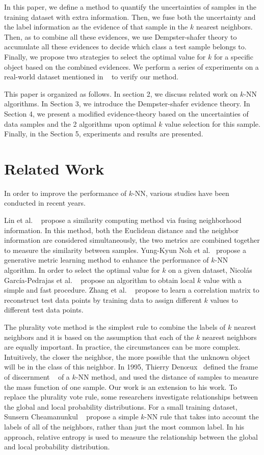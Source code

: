 \documentclass[runningheads]{llncs}
\begin{document}
In this paper, we define a method to quantify the uncertainties of samples in the training dataset with extra information. Then, we fuse both the uncertainty and the label information as the evidence of that sample in the $k$ nearest neighbors. Then, as to combine all these evidences, we use Dempster-shafer theory to accumulate  all these evidences to decide which class a test sample belongs to. Finally, we propose two strategies to select the optimal value for $k$ for a specific object based on the combined evidences. We perform a series of experiments on a real-world dataset mentioned in ~\cite{ref_article9} to verify our method.

This paper is organized as follows. In section 2, we discuss related work on $k$-NN algorithms. In Section 3, we introduce the Dempster-shafer evidence theory. In Section 4, we present a modified evidence-theory based on the uncertainties of data samples and the 2 algorithms upon optimal $k$ value selection for this sample. Finally, in the Section 5, experiments and results are presented.


\section{Related Work}
In order to improve the performance of $k$-NN, various studies have been conducted in recent years.

Lin et al. ~\cite{ref_article5} propose a similarity computing method via fusing neighborhood information. In this method, both the Euclidean distance and the neighbor information are considered simultaneously, the two metrics are combined together to measure the similarity between samples. Yung-Kyun Noh et al.~\cite{ref_article6} propose a generative metric learning method to enhance the performance of $k$-NN algorithm. In order to select the optimal value for $k$ on a given dataset,  Nicolás García-Pedrajas et al. ~\cite{ref_article7} propose an algorithm to obtain local $k$ value with a simple and fast procedure. Zhang et al. ~\cite{ref_article8} propose to learn a correlation matrix to reconstruct test data points by training data to assign different $k$ values to different test data points. 

The plurality vote method is the simplest rule to combine the labels of $k$ nearest neighbors and it is based on the assumption that each of the $k$ nearest neighbors are equally important. In practice, the circumstances can be more complex. Intuitively, the closer the neighbor, the more possible that the unknown object will be in the class of this neighbor. In 1995, Thierry Denœux~\cite{ref_article3} defined the frame of discernment ~\cite{ref_article10} of a $k$-NN method, and used  the distance of samples to measure the mass function of one sample. Our work is an extension to his work. To replace the plurality vote rule, some researchers investigate relationships between the global and local probability distributions. For a small training dataset, Sunsern Cheamanunkul ~\cite{ref_article11} propose a simple $k$-NN rule that takes into account the labels of all of the neighbors, rather than just the most common label. In his approach, relative entropy is used to measure the relationship between the global and local probability distribution.
\end{document}
